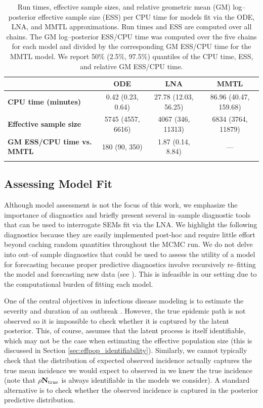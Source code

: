  \begin{table}[htbp]
 	\caption[Computational performance of the ODE, LNA, and MMTL approximations.]{Run times, effective sample sizes, and relative geometric mean (GM) log--posterior effective sample size (ESS) per CPU time for models fit via the ODE, LNA, and MMTL approximations. Run times and ESS are computed over all chains. The GM log--posterior ESS/CPU time was computed over the five chains for each model and divided by the corresponding GM ESS/CPU time for the MMTL model. We report 50\% (2.5\%, 97.5\%) quantiles of the CPU time, ESS, and relative GM ESS/CPU time.}
 	\label{tab:lna_coverage_compstats}
 	\footnotesize
 	\centering
 	\begin{tabular}{lccc}	
 		\hline	
 		& \textbf{ODE} & \textbf{LNA} & \textbf{MMTL} \\\hline
 		\textbf{CPU time (minutes)} &  0.42 (0.23, 0.64) & 27.78  (12.03, 56.25) & 86.96 (40.47, 159.68) \\ 
 		\textbf{Effective sample size} & 5745 (4557, 6616) & 4067   (346, 11313) & 6834 (3764, 11879) \\
 		\textbf{GM ESS/CPU time vs. MMTL} & 180 (90, 350) & 1.87 (0.14, 8.84) & --- \\
 		\hline
 		&&&
 	\end{tabular} 
 \end{table}

\subsection{Assessing Model Fit}
\label{subsec:lna_model_diags}

Although model assessment is not the focus of this work, we emphasize the importance of diagnostics and briefly present several in--sample diagnostic tools that can be used to interrogate SEMs fit via the LNA. We highlight the following diagnostics because they are easily implemented post-hoc and require little effort beyond caching random quantities throughout the MCMC run. We do not delve into out--of sample diagnostics that could be used to assess the utility of a model for forecasting because proper predictive diagnostics involve recursively re--fitting the model and forecasting new data (see \cite{paul2011predictive,held2018forecasting}). This is infeasible in our setting due to the computational burden of fitting each model.

One of the central objectives in infectious disease modeling is to estimate the severity and duration of an outbreak \cite{lofgren2014opinion}. However, the true epidemic path is not observed so it is impossible to check whether it is captured by the latent posterior. This, of course, assumes that the latent process is itself identifiable, which may not be the case when estimating the effective population size (this is discussed in Section \ref{sec:effpop_identifiability}). Similarly, we cannot typically check that the distribution of expected observed incidence actually captures the true mean incidence we would expect to observed in we knew the true incidence (note that $ \rho\mathbf{N}_{\mathrm{true}} $ is always identifiable in the models we consider). A standard alternative is to check whether the observed incidence is captured in the posterior predictive distribution. 

